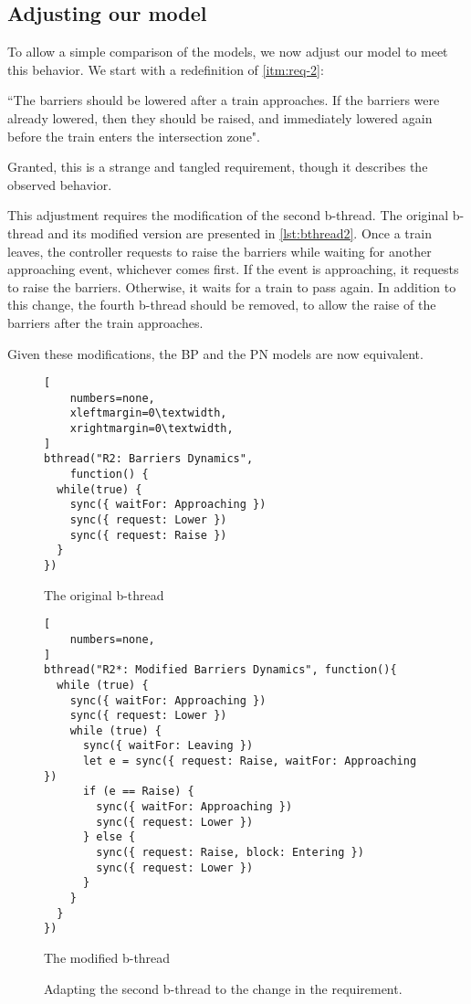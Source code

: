 \documentclass[10pt,journal,compsoc]{IEEEtran}
\theoremstyle{definition}
\begin{document}
\subsection{Adjusting our model}
To allow a simple comparison of the models, we now adjust our model to meet this behavior. We start with a redefinition of \ref{itm:req-2}:

``The barriers should be lowered after a train approaches. If the barriers were already lowered, then they should be raised, and immediately lowered again before the train enters the intersection zone".

Granted, this is a strange and tangled requirement, though it describes the observed behavior.

This adjustment requires the modification of the second b-thread. The original b-thread and its modified version are presented in \autoref{lst:bthread2}. Once a train leaves, the controller requests to raise the barriers while waiting for another approaching event, whichever comes first. If the event is approaching, it requests to raise the barriers. Otherwise, it waits for a train to pass again. In addition to this change, the fourth b-thread should be removed, to allow the raise of the barriers after the train approaches.

Given these modifications, the BP and the PN models are now equivalent. 

\begin{figure*}[tbph]
\captionsetup{type=lstlisting}
\begin{sublstlisting}[b]{0.35\linewidth}
\begin{lstlisting}[
    numbers=none,
    xleftmargin=0\textwidth,
    xrightmargin=0\textwidth,
]
bthread("R2: Barriers Dynamics", 
    function() {
  while(true) {
    sync({ waitFor: Approaching })
    sync({ request: Lower })
    sync({ request: Raise })
  }
})
\end{lstlisting}
\caption{The original b-thread}
\label{lst:bthread2:1}
\end{sublstlisting}\hfill
\begin{sublstlisting}[b]{0.6\linewidth}
\begin{lstlisting}[
    numbers=none,
]
bthread("R2*: Modified Barriers Dynamics", function(){
  while (true) {
    sync({ waitFor: Approaching })
    sync({ request: Lower })
    while (true) {
      sync({ waitFor: Leaving })
      let e = sync({ request: Raise, waitFor: Approaching })
      if (e == Raise) {
        sync({ waitFor: Approaching })
        sync({ request: Lower })
      } else {
        sync({ request: Raise, block: Entering })
        sync({ request: Lower })
      }
    }
  }
})
\end{lstlisting}
\caption{The modified b-thread}
\label{lst:bthread2:2}
\end{sublstlisting}
\caption{Adapting the second b-thread to the change in the requirement.}
\label{lst:bthread2}
\end{figure*}
\end{document}
